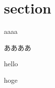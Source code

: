 \documentclass[a4paper]{jsarticle}
\begin{document}
\section{section}
aaaa

ああああ

hello

hoge
\end{document}
